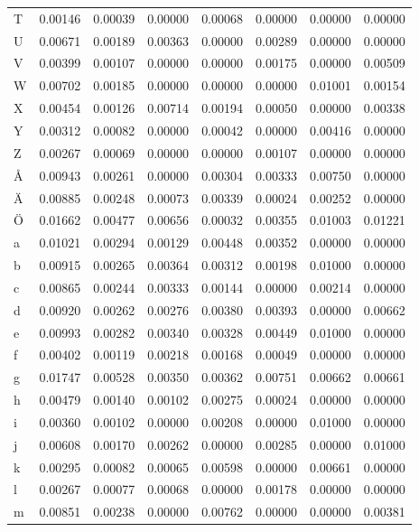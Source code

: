 \begin{tabularx}{\textwidth}{X|c|c|c|c|c|c|c}
T & 0.00146 &  0.00039 &  0.00000 &  0.00068 &  0.00000 &  0.00000 &  0.00000  \\
U & 0.00671 &  0.00189 &  0.00363 &  0.00000 &  0.00289 &  0.00000 &  0.00000  \\
V & 0.00399 &  0.00107 &  0.00000 &  0.00000 &  0.00175 &  0.00000 &  0.00509  \\
W & 0.00702 &  0.00185 &  0.00000 &  0.00000 &  0.00000 &  0.01001 &  0.00154  \\
X & 0.00454 &  0.00126 &  0.00714 &  0.00194 &  0.00050 &  0.00000 &  0.00338  \\
Y & 0.00312 &  0.00082 &  0.00000 &  0.00042 &  0.00000 &  0.00416 &  0.00000  \\
Z & 0.00267 &  0.00069 &  0.00000 &  0.00000 &  0.00107 &  0.00000 &  0.00000  \\
Å & 0.00943 &  0.00261 &  0.00000 &  0.00304 &  0.00333 &  0.00750 &  0.00000  \\
Ä & 0.00885 &  0.00248 &  0.00073 &  0.00339 &  0.00024 &  0.00252 &  0.00000  \\
Ö & 0.01662 &  0.00477 &  0.00656 &  0.00032 &  0.00355 &  0.01003 &  0.01221  \\
a & 0.01021 &  0.00294 &  0.00129 &  0.00448 &  0.00352 &  0.00000 &  0.00000  \\
b & 0.00915 &  0.00265 &  0.00364 &  0.00312 &  0.00198 &  0.01000 &  0.00000  \\
c & 0.00865 &  0.00244 &  0.00333 &  0.00144 &  0.00000 &  0.00214 &  0.00000  \\
d & 0.00920 &  0.00262 &  0.00276 &  0.00380 &  0.00393 &  0.00000 &  0.00662  \\
e & 0.00993 &  0.00282 &  0.00340 &  0.00328 &  0.00449 &  0.01000 &  0.00000  \\
f & 0.00402 &  0.00119 &  0.00218 &  0.00168 &  0.00049 &  0.00000 &  0.00000  \\
g & 0.01747 &  0.00528 &  0.00350 &  0.00362 &  0.00751 &  0.00662 &  0.00661  \\
h & 0.00479 &  0.00140 &  0.00102 &  0.00275 &  0.00024 &  0.00000 &  0.00000  \\
i & 0.00360 &  0.00102 &  0.00000 &  0.00208 &  0.00000 &  0.01000 &  0.00000  \\
j & 0.00608 &  0.00170 &  0.00262 &  0.00000 &  0.00285 &  0.00000 &  0.01000  \\
k & 0.00295 &  0.00082 &  0.00065 &  0.00598 &  0.00000 &  0.00661 &  0.00000  \\
l & 0.00267 &  0.00077 &  0.00068 &  0.00000 &  0.00178 &  0.00000 &  0.00000  \\
m & 0.00851 &  0.00238 &  0.00000 &  0.00762 &  0.00000 &  0.00000 &  0.00381  \\
\end{tabularx}

